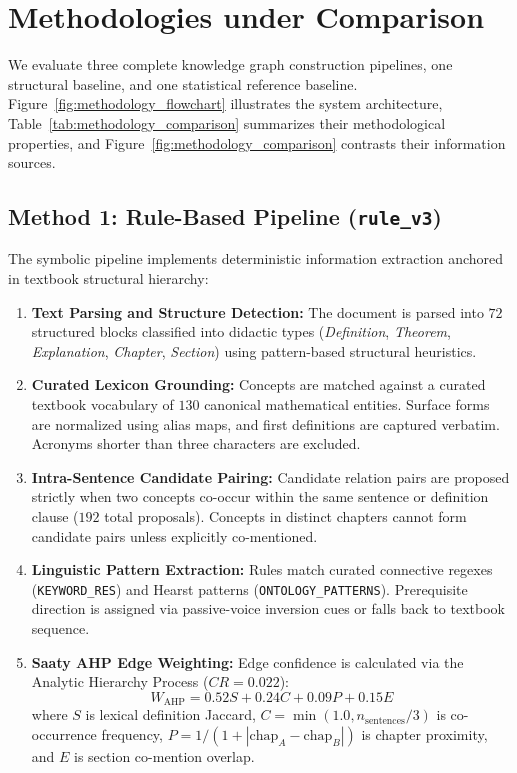 \section{Methodologies under Comparison}
\label{sec:methodology}




We evaluate three complete knowledge graph construction pipelines, one structural baseline, and one statistical reference baseline. Figure~\ref{fig:methodology_flowchart} illustrates the system architecture, Table~\ref{tab:methodology_comparison} summarizes their methodological properties, and Figure~\ref{fig:methodology_comparison} contrasts their information sources.




\subsection{Method 1: Rule-Based Pipeline (\texttt{rule\_v3})}
The symbolic pipeline implements deterministic information extraction anchored in textbook structural hierarchy:
\begin{enumerate}[leftmargin=*]
    \item \textbf{Text Parsing and Structure Detection:} The document is parsed into $72$ structured blocks classified into didactic types (\textit{Definition}, \textit{Theorem}, \textit{Explanation}, \textit{Chapter}, \textit{Section}) using pattern-based structural heuristics.
    \item \textbf{Curated Lexicon Grounding:} Concepts are matched against a curated textbook vocabulary of $130$ canonical mathematical entities. Surface forms are normalized using alias maps, and first definitions are captured verbatim. Acronyms shorter than three characters are excluded.
    \item \textbf{Intra-Sentence Candidate Pairing:} Candidate relation pairs are proposed strictly when two concepts co-occur within the same sentence or definition clause ($192$ total proposals). Concepts in distinct chapters cannot form candidate pairs unless explicitly co-mentioned.
    \item \textbf{Linguistic Pattern Extraction:} Rules match curated connective regexes (\texttt{KEYWORD\_RES}) and Hearst patterns (\texttt{ONTOLOGY\_PATTERNS}). Prerequisite direction is assigned via passive-voice inversion cues or falls back to textbook sequence.
    \item \textbf{Saaty AHP Edge Weighting:} Edge confidence is calculated via the Analytic Hierarchy Process ($CR=0.022$):
    \begin{equation}
    W_{\text{AHP}} = 0.52 S + 0.24 C + 0.09 P + 0.15 E
    \end{equation}
    where $S$ is lexical definition Jaccard, $C = \min(1.0, n_{\text{sentences}}/3)$ is co-occurrence frequency, $P = 1 / (1 + |\text{chap}_A - \text{chap}_B|)$ is chapter proximity, and $E$ is section co-mention overlap.
\end{enumerate}

